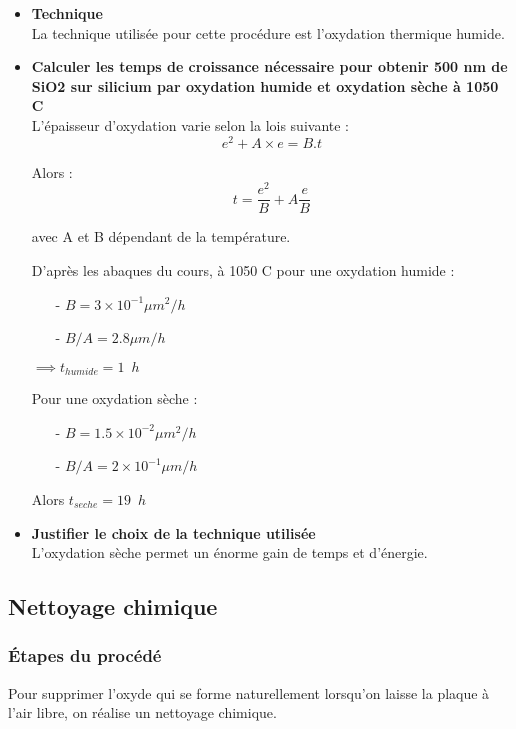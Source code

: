 \documentclass[11pt]{article}
\begin{document}
\begin{itemize}
\item \textbf{Technique}\\
La technique utilis\'ee pour cette proc\'edure est l'oxydation thermique humide.

\item \textbf{Calculer les temps de croissance n\'ecessaire pour obtenir 500 nm de SiO2 sur silicium par oxydation humide et oxydation s\`eche \`a 1050 C}\\

L'\'epaisseur d'oxydation varie selon la lois suivante :
\[
    e^{2} + A \times e = B.t
\]

Alors :
\[
t = \frac{e^{2}}{B} + A\frac{e}{B}
\]

avec A et B d\'ependant de la temp\'erature.

D'apr\`es les abaques du cours, \`a 1050 C pour une oxydation humide : 
\begin{itemize} \itemsep -2pt
\item[-] $B = 3 \times 10^{-1} \mu m^{2}/h$
\item[-] $B/A = 2.8 \mu m/h$
\end{itemize}

$\implies t_{humide} = 1 \phantom{2} h$

Pour une oxydation s\`eche :

\begin{itemize} \itemsep -2pt
\item[-] $B = 1.5 \times 10^{-2} \mu m^{2}/h$
\item[-] $B/A = 2 \times 10^{-1} \mu m/h$
\end{itemize}


Alors $t_{seche} = 19 \phantom{2} h$


\item \textbf{Justifier le choix de la technique utilis\'ee}\\
L'oxydation s\`eche permet un \'enorme gain de temps et d'\'energie.
\end{itemize}

\subsection{Nettoyage chimique}

\subsubsection{\'Etapes du proc\'ed\'e} 
Pour supprimer l'oxyde qui se forme naturellement lorsqu'on laisse la plaque \`a l'air libre, on r\'ealise un nettoyage chimique.
\end{document}
